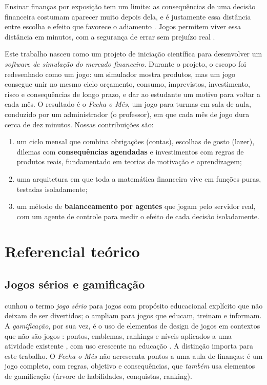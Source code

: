 \documentclass[11pt,a4paper]{article}
\begin{document}
Ensinar finanças por exposição tem um limite: as consequências de uma decisão financeira costumam aparecer muito depois dela, e é justamente essa distância entre escolha e efeito que favorece o adiamento \cite{odonoghue1999}. Jogos permitem viver essa distância em minutos, com a segurança de errar sem prejuízo real \cite{gee2003}.

Este trabalho nasceu como um projeto de iniciação científica para desenvolver um \emph{software de simulação do mercado financeiro}. Durante o projeto, o escopo foi redesenhado como um jogo: um simulador mostra produtos, mas um jogo consegue unir no mesmo ciclo orçamento, consumo, imprevistos, investimento, risco e consequências de longo prazo, e dar ao estudante um motivo para voltar a cada mês. O resultado é o \emph{Fecha o Mês}, um jogo para turmas em sala de aula, conduzido por um administrador (o professor), em que cada mês de jogo dura cerca de dez minutos. Nossas contribuições são:
\begin{enumerate}[leftmargin=*,itemsep=2pt]
  \item um ciclo mensal que combina obrigações (contas), escolhas de gosto (lazer), dilemas com \textbf{consequências agendadas} e investimentos com regras de produtos reais, fundamentado em teorias de motivação e aprendizagem;
  \item uma arquitetura em que toda a matemática financeira vive em funções puras, testadas isoladamente;
  \item um método de \textbf{balanceamento por agentes} que jogam pelo servidor real, com um agente de controle para medir o efeito de cada decisão isoladamente.
\end{enumerate}

\section{Referencial teórico}

\subsection{Jogos sérios e gamificação}

\citet{abt1970} cunhou o termo \emph{jogo sério} para jogos com propósito educacional explícito que não deixam de ser divertidos; \citet{michael2006} o ampliam para jogos que educam, treinam e informam. A \emph{gamificação}, por sua vez, é o uso de elementos de design de jogos em contextos que não são jogos \cite{deterding2011}: pontos, emblemas, rankings e níveis aplicados a uma atividade existente \cite{werbach2012}, com uso crescente na educação \cite{kapp2012}. A distinção importa para este trabalho. O \emph{Fecha o Mês} não acrescenta pontos a uma aula de finanças: é um jogo completo, com regras, objetivo e consequências, que \emph{também} usa elementos de gamificação (árvore de habilidades, conquistas, ranking).
\end{document}
